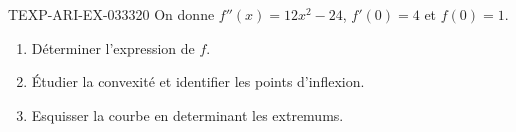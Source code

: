\begin{exercice}{TEXP-ARI-EX-033}{3}{20}
On donne $f''(x) = 12x^2 - 24$, $f'(0) = 4$ et $f(0) = 1$.
\begin{enumerate}
  \item Déterminer l'expression de $f$.
  \item Étudier la convexité et identifier les points d'inflexion.
  \item Esquisser la courbe en determinant les extremums.
\end{enumerate}

\end{exercice}
